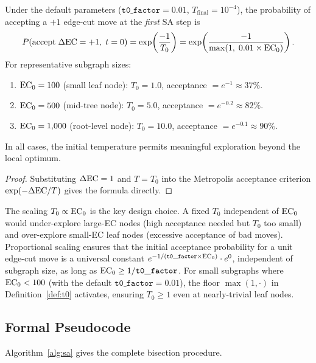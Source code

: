 \begin{proposition}
\label{prop:acceptance}
Under the default parameters ($\mathtt{t0\_factor} = 0.01$,
$T_{\mathrm{final}} = 10^{-4}$), the probability of accepting a
$+1$ edge-cut move at the \emph{first} SA step is
\[
  P(\text{accept}\; \Delta\mathrm{EC} = +1,\; t=0)
  = \exp\!\left(\frac{-1}{T_0}\right)
  = \exp\!\left(\frac{-1}{\max(1,\; 0.01 \times \mathrm{EC}_0)}\right).
\]
For representative subgraph sizes:
\begin{enumerate}
\item $\mathrm{EC}_0 = 100$ (small leaf node): $T_0 = 1.0$, acceptance $= e^{-1} \approx 37\%$.
\item $\mathrm{EC}_0 = 500$ (mid-tree node): $T_0 = 5.0$, acceptance $= e^{-0.2} \approx 82\%$.
\item $\mathrm{EC}_0 = 1{,}000$ (root-level node): $T_0 = 10.0$, acceptance $= e^{-0.1} \approx 90\%$.
\end{enumerate}
In all cases, the initial temperature permits meaningful exploration beyond
the \metis{} local optimum.
\end{proposition}

\begin{proof}
Substituting $\Delta\mathrm{EC} = 1$ and $T = T_0$ into the Metropolis acceptance
criterion $\exp(-\Delta\mathrm{EC} / T)$ gives the formula directly.
\end{proof}

\begin{remark}
The scaling $T_0 \propto \mathrm{EC}_0$ is the key design choice.
A fixed $T_0$ independent of $\mathrm{EC}_0$ would under-explore large-EC nodes
(high acceptance needed but $T_0$ too small) and over-explore small-EC
leaf nodes (excessive acceptance of bad moves).
Proportional scaling ensures that the initial acceptance probability for a
unit edge-cut move is a universal constant $e^{-1/(\mathtt{t0\_factor} \times \mathrm{EC}_0)} \cdot e^0$,
independent of subgraph size, as long as $\mathrm{EC}_0 \ge 1/\mathtt{t0\_factor}$.
For small subgraphs where $\mathrm{EC}_0 < 100$ (with the default $\mathtt{t0\_factor} = 0.01$),
the floor $\max(1, \cdot)$ in Definition~\ref{def:t0} activates, ensuring
$T_0 \ge 1$ even at nearly-trivial leaf nodes.
\end{remark}

\subsection{Formal Pseudocode}

Algorithm~\ref{alg:sa} gives the complete \sa{} bisection procedure.

